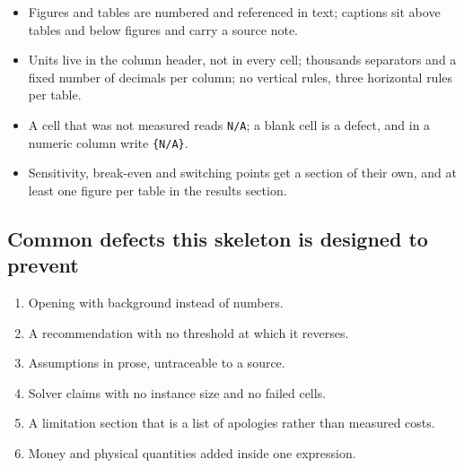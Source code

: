 \documentclass[11pt,a4paper]{article}
\begin{document}
{\begin{itemize}
  \item Figures and tables are numbered and referenced in text; captions sit
        above tables and below figures and carry a source note.
  \item Units live in the column header, not in every cell; thousands separators
        and a fixed number of decimals per column; no vertical rules, three
        horizontal rules per table.
  \item A cell that was not measured reads \texttt{N/A}; a blank cell is a
        defect, and in a numeric column write \texttt{\{N/A\}}.
  \item Sensitivity, break-even and switching points get a section of their own,
        and at least one figure per table in the results section.
\end{itemize}

\subsection*{Common defects this skeleton is designed to prevent}

{\small
\begin{enumerate}
  \item Opening with background instead of numbers.
  \item A recommendation with no threshold at which it reverses.
  \item Assumptions in prose, untraceable to a source.
  \item Solver claims with no instance size and no failed cells.
  \item A limitation section that is a list of apologies rather than measured
        costs.
  \item Money and physical quantities added inside one expression.
\end{enumerate}}
}
\end{document}
